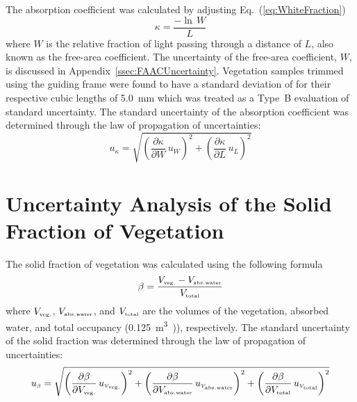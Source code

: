 \documentclass[12pt]{article}
\begin{document}
The absorption coefficient was calculated by adjusting Eq.~(\ref{eq:WhiteFraction})
\begin{equation}\label{eq:abs_coef}
\kappa = \frac {-\ln \, W}{L}
\end{equation}
where $W$ is the relative fraction of light passing through a distance of $L$, also known as the free-area coefficient. The uncertainty of the free-area coefficient, $W$, is discussed in Appendix~\ref{ssec:FAACUncertainty}.  Vegetation samples trimmed using the guiding frame were found to have a standard deviation of for their respective cubic lengths of 5.0~\si{mm} which was treated as a Type~B evaluation of standard uncertainty.  The standard uncertainty of the absorption coefficient was determined through the law of propagation of uncertainties:
\begin{equation}
\label{eq:Abs_Coef_Uncertainty}
u_{\scriptscriptstyle \kappa} = \sqrt{{\left( \frac{\partial \kappa}{\partial W}\,u_{\scriptscriptstyle W} \right) }^2+{\left(\frac{\partial \kappa}{\partial L}\,u_{\scriptscriptstyle L}\right)}^2}
\end{equation}
\pagebreak

\section{Uncertainty Analysis of the Solid Fraction of Vegetation} \label{sec:UncertaintySolidFrac}

The solid fraction of vegetation was calculated using the following formula
\begin{equation}\label{eq:Solid_Frac}
\beta = \frac {V_{\rm \scriptscriptstyle veg.}-V_{\rm \scriptscriptstyle abs.water}}{V_{\rm \scriptscriptstyle total}}
\end{equation}
where $V_{\rm \scriptscriptstyle veg.}$, $V_{\rm \scriptscriptstyle abs.water}$, and $V_{\rm \scriptscriptstyle total}$ are the volumes of the vegetation, absorbed water, and total occupancy (0.125~\si{m^3)}), respectively. The standard uncertainty of the solid fraction was determined through the law of propagation of uncertainties:
\begin{equation}
\label{eq:Solid_Frac_Uncertainty}
u_{\scriptscriptstyle \beta} = \sqrt{{\left( \frac{\partial \beta}{\partial V_{\rm \scriptscriptstyle veg.}}\,u_{\scriptscriptstyle V_{\rm \scriptscriptstyle veg.}} \right) }^2+{\left( \frac{\partial \beta}{\partial V_{\rm \scriptscriptstyle abs.water}}\,u_{\scriptscriptstyle V_{\rm \scriptscriptstyle abs.water}} \right) }^2+{\left( \frac{\partial \beta}{\partial V_{\rm \scriptscriptstyle total}}\,u_{\scriptscriptstyle V_{\rm \scriptscriptstyle total}} \right) }^2}
\end{equation}
\end{document}
